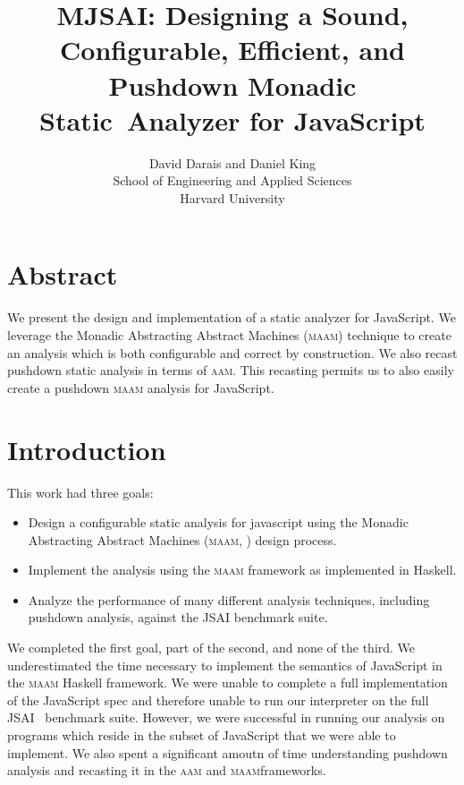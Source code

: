 \documentclass[10pt,letter,english]{article}
\newcommand{\aam}[0]{\textsc{aam}}
\newcommand{\maam}[0]{\textsc{maam}}
\newcommand{\js}[0]{JavaScript}
\begin{document}
\title{MJSAI: Designing a Sound, Configurable, Efficient, and Pushdown %
              Monadic Static~Analyzer for JavaScript}
\author{{David Darais and Daniel King}\\
        School of Engineering and Applied Sciences\\
        Harvard University}

\maketitle

\section*{Abstract}

We present the design and implementation of a static analyzer for \js{}. We
leverage the Monadic Abstracting Abstract Machines (\maam{}) technique to
create an analysis which is both configurable and correct by construction. We
also recast pushdown static analysis in terms of \aam{}. This recasting permits
us to also easily create a pushdown \maam{} analysis for \js{}.

\section{Introduction}

This work had three goals:

\begin{itemize}
\item Design a configurable static analysis for javascript using the
  Monadic Abstracting Abstract Machines (\maam{}, \cite{maam}) design process.
\item Implement the analysis using the \maam{} framework as implemented in Haskell.
\item Analyze the performance of many different analysis techniques, including
  pushdown analysis, against the JSAI \cite{jsai} benchmark suite.
\end{itemize}

We completed the first goal, part of the second, and none of the third.
%
We underestimated the time necessary to implement the semantics of \js{} in the
\maam{} Haskell framework.
%
We were unable to complete a full implementation of the \js{} spec and
therefore unable to run our interpreter on the full JSAI~\cite{jsai} benchmark
suite.
%
However, we were successful in running our analysis on programs which reside in
the subset of \js{} that we were able to implement.
%
We also spent a significant amoutn of time understanding pushdown analysis and
recasting it in the \aam{} and \maam frameworks.
\end{document}

